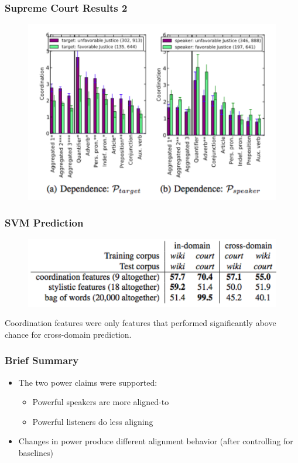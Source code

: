 \documentclass{beamer}
\begin{document}
\begin{frame}
\frametitle{Supreme Court Results 2}
\begin{figure}
\includegraphics[width=0.8\linewidth]{supremeresults2.png}
\end{figure}
\end{frame}
\begin{frame}
\frametitle{SVM Prediction}
\begin{figure}
\includegraphics[width=0.8\linewidth]{svmresults.png}
\end{figure}
Coordination features were only features that performed significantly above chance for cross-domain prediction. 
\end{frame}
\begin{frame}
\frametitle{Brief Summary}
\begin{itemize}
	\item The two power claims were supported:
	\begin{itemize}
		\item Powerful speakers are more aligned-to
		\item Powerful listeners do less aligning 
	\end{itemize}
	\item Changes in power produce different alignment behavior (after controlling for baselines)
\end{itemize}
\end{frame}
\end{document}

